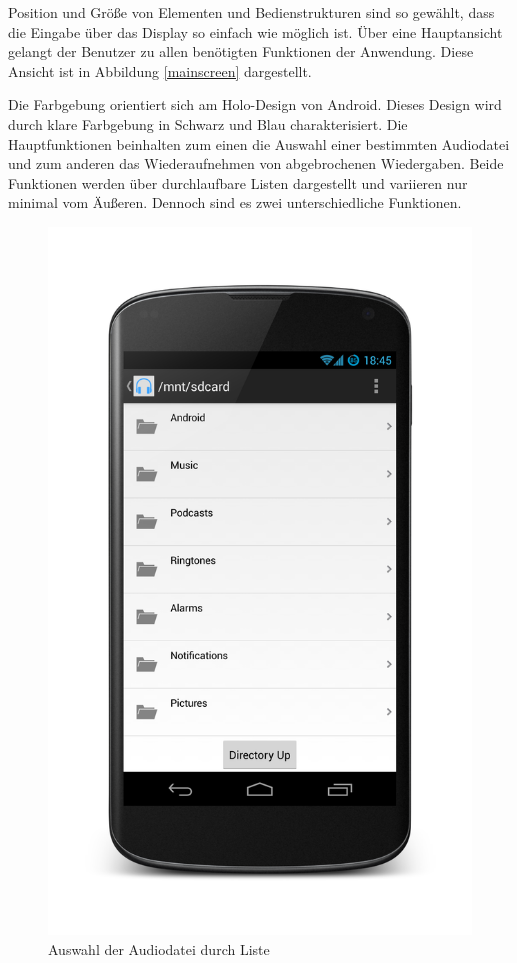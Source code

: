 Position und Größe von Elementen und Bedienstrukturen sind so gewählt, dass die Eingabe über das Display so einfach wie möglich ist. Über eine Hauptansicht gelangt der Benutzer zu allen benötigten Funktionen der Anwendung. Diese Ansicht ist in Abbildung \ref{mainscreen} dargestellt.

Die Farbgebung orientiert sich am Holo-Design von Android. Dieses Design wird durch klare Farbgebung in Schwarz und Blau charakterisiert. Die Hauptfunktionen beinhalten zum einen die Auswahl einer bestimmten Audiodatei und zum anderen das Wiederaufnehmen von abgebrochenen Wiedergaben. Beide Funktionen werden über durchlaufbare Listen dargestellt und variieren nur minimal vom Äußeren. Dennoch sind es zwei unterschiedliche Funktionen.

\begin{figure}[h!t]
\begin{center}
\includegraphics[scale=.2]{images/browsing}
\caption{Auswahl der Audiodatei durch Liste}
\label{browsing}
\end{center}
\end{figure}


